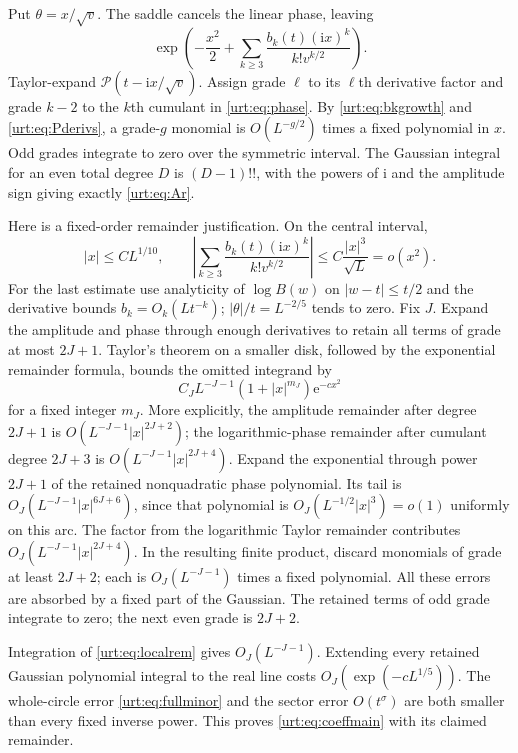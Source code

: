 \documentclass[11pt,letterpaper]{article}
\theoremstyle{remark}\newtheorem{remark}[theorem]{Remark}
\newcommand{\Pc}{\mathcal P}\newcommand{\Bc}{\mathcal B}\newcommand{\dd}{\mathrm d}
\newcommand{\ii}{\mathrm i}\newcommand{\ee}{\mathrm e}\newcommand{\ZZ}{\mathbb Z}\newcommand{\NN}{\mathbb N}
\begin{document}
Put $\theta=x/\sqrt v$. The saddle cancels the linear phase, leaving
\begin{equation}\label{urt:eq:phase}
 \exp\left(-\frac{x^2}{2}
       +\sum_{k\ge3}\frac{b_k(t)(\ii x)^k}{k!v^{k/2}}\right).
\end{equation}
Taylor-expand $\Pc(t-\ii x/\sqrt v)$. Assign grade $\ell$ to its $\ell$th derivative factor and grade $k-2$ to the $k$th cumulant in \eqref{urt:eq:phase}. By \eqref{urt:eq:bkgrowth} and \eqref{urt:eq:Pderivs}, a grade-$g$ monomial is $O(L^{-g/2})$ times a fixed polynomial in $x$. Odd grades integrate to zero over the symmetric interval. The Gaussian integral for an even total degree $D$ is $(D-1)!!$, with the powers of $\ii$ and the amplitude sign giving exactly \eqref{urt:eq:Ar}.

Here is a fixed-order remainder justification. On the central interval,
\[
 |x|\le C L^{1/10},\qquad
 \left|\sum_{k\ge3}\frac{b_k(t)(\ii x)^k}{k!v^{k/2}}\right|
       \le C\frac{|x|^3}{\sqrt L}=o(x^2).
\]
For the last estimate use analyticity of $\log B(w)$ on $|w-t|\le t/2$ and the derivative bounds $b_k=O_k(Lt^{-k})$; $|\theta|/t=L^{-2/5}$ tends to zero. Fix $J$. Expand the amplitude and phase through enough derivatives to retain all terms of grade at most $2J+1$. Taylor's theorem on a smaller disk, followed by the exponential remainder formula, bounds the omitted integrand by
\begin{equation}\label{urt:eq:localrem}
 C_J L^{-J-1}(1+|x|^{m_J})\ee^{-c x^2}
\end{equation}
for a fixed integer $m_J$. More explicitly, the amplitude remainder after degree $2J+1$ is $O(L^{-J-1}|x|^{2J+2})$; the logarithmic-phase remainder after cumulant degree $2J+3$ is $O(L^{-J-1}|x|^{2J+4})$. Expand the exponential through power $2J+1$ of the retained nonquadratic phase polynomial. Its tail is $O_J(L^{-J-1}|x|^{6J+6})$, since that polynomial is $O_J(L^{-1/2}|x|^3)=o(1)$ uniformly on this arc. The factor from the logarithmic Taylor remainder contributes $O_J(L^{-J-1}|x|^{2J+4})$. In the resulting finite product, discard monomials of grade at least $2J+2$; each is $O_J(L^{-J-1})$ times a fixed polynomial. All these errors are absorbed by a fixed part of the Gaussian. The retained terms of odd grade integrate to zero; the next even grade is $2J+2$.

Integration of \eqref{urt:eq:localrem} gives $O_J(L^{-J-1})$. Extending every retained Gaussian polynomial integral to the real line costs $O_J(\exp(-cL^{1/5}))$. The whole-circle error \eqref{urt:eq:fullminor} and the sector error $O(t^\sigma)$ are both smaller than every fixed inverse power. This proves \eqref{urt:eq:coeffmain} with its claimed remainder.
\end{document}
